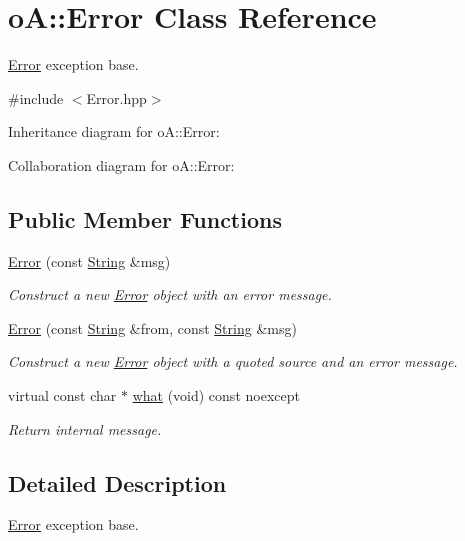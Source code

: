 \hypertarget{classo_a_1_1_error}{}\section{oA\+:\+:Error Class Reference}
\label{classo_a_1_1_error}


\mbox{\hyperlink{classo_a_1_1_error}{Error}} exception base.  




{\ttfamily \#include $<$Error.\+hpp$>$}



Inheritance diagram for oA\+:\+:Error\+:


Collaboration diagram for oA\+:\+:Error\+:
\subsection*{Public Member Functions}
\begin{DoxyCompactItemize}
\item 
\mbox{\hyperlink{classo_a_1_1_error_a16d10704561d2b756722d71d8703089c}{Error}} (const \mbox{\hyperlink{classo_a_1_1_string}{String}} \&msg)
\begin{DoxyCompactList}\small\item\em Construct a new \mbox{\hyperlink{classo_a_1_1_error}{Error}} object with an error message. \end{DoxyCompactList}\item 
\mbox{\hyperlink{classo_a_1_1_error_adf66492ca8b03fa14d09e5bba7cdacbd}{Error}} (const \mbox{\hyperlink{classo_a_1_1_string}{String}} \&from, const \mbox{\hyperlink{classo_a_1_1_string}{String}} \&msg)
\begin{DoxyCompactList}\small\item\em Construct a new \mbox{\hyperlink{classo_a_1_1_error}{Error}} object with a quoted source and an error message. \end{DoxyCompactList}\item 
virtual const char $\ast$ \mbox{\hyperlink{classo_a_1_1_error_aaef80480c87b91b1a34853c791b649ef}{what}} (void) const noexcept
\begin{DoxyCompactList}\small\item\em Return internal message. \end{DoxyCompactList}\end{DoxyCompactItemize}


\subsection{Detailed Description}
\mbox{\hyperlink{classo_a_1_1_error}{Error}} exception base. 


